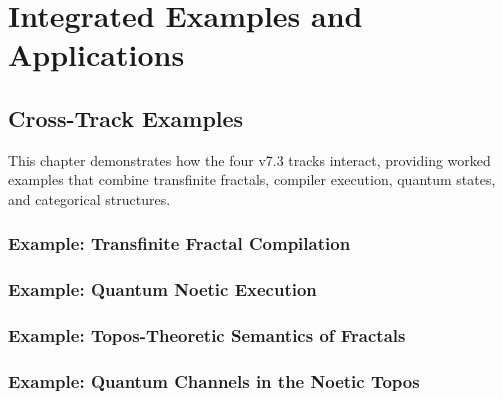 \documentclass[11pt,twoside,openright]{book}
\theoremstyle{definition}
\theoremstyle{plain}
\theoremstyle{remark}
\begin{document}


\part{Integrated Examples and Applications}
\label{part:integrated}

\chapter{Cross-Track Examples}
\label{ch:cross-track-examples}

\begin{tcolorbox}[colback=green!5!white,colframe=green!75!black,title=\textbf{Integration Chapter}]
This chapter demonstrates how the four v7.3 tracks interact, providing worked examples that combine transfinite fractals, compiler execution, quantum states, and categorical structures.
\end{tcolorbox}


\section{Example: Transfinite Fractal Compilation}

\section{Example: Quantum Noetic Execution}

\section{Example: Topos-Theoretic Semantics of Fractals}

\section{Example: Quantum Channels in the Noetic Topos}

\end{document}
